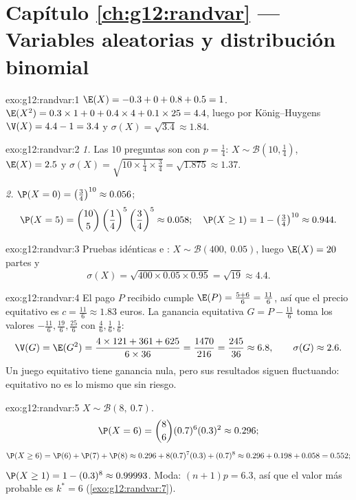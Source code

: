 \section*{Capítulo \ref{ch:g12:randvar} --- Variables aleatorias y distribución binomial}

\begin{solution}{exo:g12:randvar:1}
$\E(X) = -0.3 + 0 + 0.8 + 0.5 = 1$.
$\E(X^2) = 0.3 \times 1 + 0 + 0.4\times4 + 0.1\times25 = 4.4$, luego por
König--Huygens $\V(X) = 4.4 - 1 = 3.4$ y
$\sigma(X) = \sqrt{3.4} \approx 1.84$.
\end{solution}

\begin{solution}{exo:g12:randvar:2}
\emph{1.} Las $10$ preguntas son   con
$p = \frac14$: $X \sim \mathcal B\left(10, \frac14\right)$,
$\E(X) = 2.5$ y
$\sigma(X) = \sqrt{10 \times \frac14 \times \frac34} = \sqrt{1.875}
\approx 1.37$.

\emph{2.} $\P(X = 0) = \left(\frac34\right)^{10} \approx 0.056$;
\[
\P(X = 5) = \binom{10}{5}\left(\frac14\right)^5\left(\frac34\right)^5
\approx 0.058;
\quad
\P(X \geq 1) = 1 - \left(\tfrac34\right)^{10} \approx 0.944 .
\]
\end{solution}

\begin{solution}{exo:g12:randvar:3}
Pruebas idénticas e : $X \sim \mathcal B(400,\ 0.05)$, luego
$\E(X) = 20$ partes y
\[
\sigma(X) = \sqrt{400 \times 0.05 \times 0.95} = \sqrt{19} \approx 4.4 .
\]
\end{solution}

\begin{solution}{exo:g12:randvar:4}
El pago $P$ recibido cumple $\E(P) = \frac{5 + 6}{6} = \frac{11}{6}$, así
que el precio equitativo es $c = \frac{11}{6} \approx 1.83$ euros. La
ganancia equitativa $G = P - \frac{11}6$ toma los valores
$-\frac{11}{6}, \frac{19}{6}, \frac{25}{6}$ con 
$\frac46, \frac16, \frac16$:
\[
\V(G) = \E(G^2)
= \frac{4 \times 121 + 361 + 625}{6 \times 36} = \frac{1470}{216}
= \frac{245}{36} \approx 6.8,
\qquad \sigma(G) \approx 2.6 .
\]
Un juego equitativo tiene ganancia \emph{} nula, pero sus resultados
siguen fluctuando: equitativo no es lo mismo que sin riesgo.
\end{solution}

\begin{solution}{exo:g12:randvar:5}
$X \sim \mathcal B(8,\ 0.7)$.
\[
\P(X = 6) = \binom86 (0.7)^6(0.3)^2 \approx 0.296 ;
\]
\[
\P(X \geq 6) = \P(6) + \P(7) + \P(8)
\approx 0.296 + 8(0.7)^7(0.3) + (0.7)^8
\approx 0.296 + 0.198 + 0.058 = 0.552 ;
\]
$\P(X \geq 1) = 1 - (0.3)^8 \approx 0.99993$. Moda: $(n+1)p = 6.3$, así que
el valor más probable es $k^* = 6$ (\cref{exo:g12:randvar:7}).
\end{solution}

